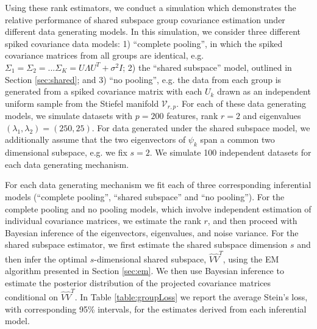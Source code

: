 \documentclass{article}
\begin{document}
Using these rank estimators, we conduct a simulation which demonstrates
the relative performance of shared subspace group covariance
estimation under different data generating models.  In this
simulation, we consider three different spiked covariance data models:
1) ``complete pooling'', in which the spiked covariance matrices from
all groups are identical, e.g.
$\Sigma_1 = \Sigma_2 = ... \Sigma_K = U\Lambda U^T + \sigma^2I$; 2)
the ``shared subspace'' model, outlined in Section \ref{sec:shared};
and 3) ``no pooling'', e.g. the data from each group is generated from
a spiked covariance matrix with each $U_k$ drawn as an independent
uniform sample from the Stiefel manifold $\mathcal{V}_{r, p}$.  For
each of these data generating models, we simulate datasets with
$p=200$ features, rank $r=2$ and eigenvalues
$(\lambda_1, \lambda_2) = (250, 25)$.  For data generated under the
shared subspace model, we additionally assume that the two
eigenvectors of $\psi_k$ span a common two dimensional subspace, e.g. we fix
$s=2$.  We simulate 100 independent datasets for each data generating
mechanism.

For each data generating mechanism we fit each of three corresponding
inferential models (``complete pooling'', ``shared subspace'' and ``no
pooling''). For the complete pooling and no pooling models, which
involve independent estimation of individual covariance matrices, we
estimate the rank $r$, and then proceed with Bayesian inference of the
eigenvectors, eigenvalues, and noise variance.  For the shared
subspace estimator, we first estimate the shared subspace dimension
$s$ and then infer the optimal $s$-dimensional shared subspace,
$\hat{V}\hat{V}^T$, using the EM algorithm presented in Section
\ref{sec:em}.  We then use Bayesian inference to estimate the
posterior distribution of the projected covariance matrices
conditional on $\hat{V}\hat{V}^T$.  In Table \ref{table:groupLoss} we report the
average Stein's loss, with corresponding 95\% intervals, for the
estimates derived from each inferential model.
\end{document}
